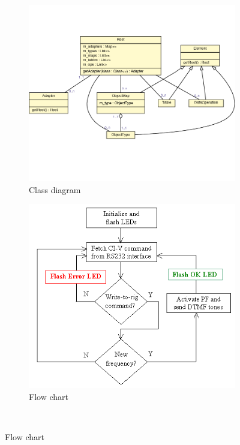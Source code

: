 \begin{figure}
\centering
\begin{subfigure}{.5\textwidth}
  \includegraphics[width=.95\linewidth]{../images/code-visualisations/class-diagram.png}
  \caption{Class diagram}
  \label{fig:class-diagram}
\end{subfigure}%
\begin{subfigure}{.5\textwidth}
  \includegraphics[width=.95\linewidth]{../images/code-visualisations/flow-chart.png}
  \caption{Flow chart}
  \label{fig:flow-chart}
\end{subfigure}\\

\end{figure}
